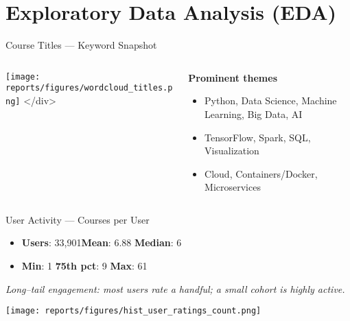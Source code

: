 \documentclass[aspectratio=169]{beamer}
\newcommand{\users}{33{,}901}
\begin{document}
\section{Exploratory Data Analysis (EDA)}

\begin{frame}{Course Titles — Keyword Snapshot}
\begin{columns}[c]
  \begin{column}{0.60\textwidth}
    \texttt{[image: reports/figures/wordcloud\_titles.png]}
  </div>
  \end{column}
  \begin{column}{0.38\textwidth}
    \textbf{Prominent themes}
    \begin{itemize}
      \item Python, Data Science, Machine Learning, Big Data, AI
      \item TensorFlow, Spark, SQL, Visualization
      \item Cloud, Containers/Docker, Microservices
    \end{itemize}
  \end{column}
\end{columns}
\end{frame}

\begin{frame}{User Activity — Courses per User}
\begin{itemize}
  \item \textbf{Users}: \users \quad \textbf{Mean}: 6.88 \quad \textbf{Median}: 6
  \item \textbf{Min}: 1 \quad \textbf{75th pct}: 9 \quad \textbf{Max}: 61
\end{itemize}

\medskip
\textit{Long–tail engagement: most users rate a handful; a small cohort is highly active.}

\bigskip
\centering
\texttt{[image: reports/figures/hist\_user\_ratings\_count.png]}
\end{frame}
\end{document}
